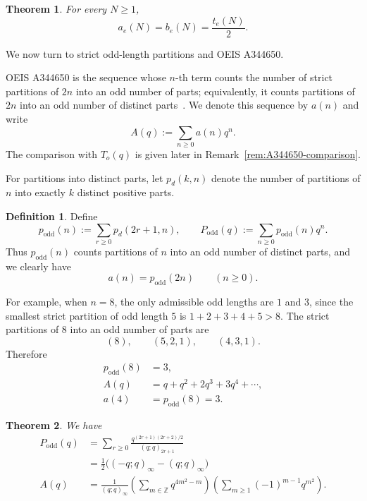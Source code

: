 \documentclass[reqno]{amsart}
\theoremstyle{plain}
\newtheorem{theorem}{Theorem}
\theoremstyle{definition}
\newtheorem{definition}{Definition}
\theoremstyle{remark}
\numberwithin{equation}{section}
\newcommand{\qpoch}[2]{(#1;#2)_\infty}
\newcommand{\qpochn}[3]{(#1;#2)_{#3}}
\begin{document}
\begin{theorem}\label{thm:Te-partitions}
For every $N\ge 1$,
\[
a_e(N)=b_e(N)=\frac{t_e(N)}{2}.
\]
\end{theorem}

We now turn to strict odd-length partitions and OEIS A344650.

OEIS A344650 is the sequence whose $n$-th term counts the number of strict partitions of $2n$ into an odd number of parts; equivalently, it counts partitions of $2n$ into an odd number of distinct parts~\cite{OEISA344650}. We denote this sequence by $a(n)$ and write
\[
A(q):=\sum_{n\ge 0} a(n)q^n.
\]
The comparison with $T_o(q)$ is given later in Remark~\ref{rem:A344650-comparison}.

For partitions into distinct parts, let $p_d(k,n)$ denote the number of partitions of $n$ into exactly $k$ distinct positive parts.

\begin{definition}\label{def:Podd}
Define
\[
p_{\mathrm{odd}}(n):=\sum_{r\ge 0} p_d(2r+1,n),
\qquad
P_{\mathrm{odd}}(q):=\sum_{n\ge 0} p_{\mathrm{odd}}(n)q^n.
\]
Thus $p_{\mathrm{odd}}(n)$ counts partitions of $n$ into an odd number of distinct parts, and we clearly have
\begin{equation}\label{a-podd}
a(n)=p_{\mathrm{odd}}(2n)\qquad(n\ge 0).
\end{equation}
\end{definition}

For example, when $n=8$, the only admissible odd lengths are $1$ and $3$, since the smallest strict partition of odd length $5$ is $1+2+3+4+5>8$. The strict partitions of $8$ into an odd number of parts are
\[
(8),\qquad (5,2,1),\qquad (4,3,1).
\]
Therefore
\begin{align*}
p_{\mathrm{odd}}(8)&=3,\\
A(q)&=q+q^2+2q^3+3q^4+\cdots,\\
a(4)&=p_{\mathrm{odd}}(8)=3.
\end{align*}

\begin{theorem}\label{thm:A344650}
We have
\begin{align}
P_{\mathrm{odd}}(q)
&=\sum_{r\ge 0}\frac{q^{(2r+1)(2r+2)/2}}{\qpochn{q}{q}{2r+1}} \label{Podd-1} \\
&=\frac12\bigl(\qpoch{-q}{q}-\qpoch{q}{q}\bigr) \label{Podd-2} \\
A(q)
&=\frac{1}{\qpoch{q}{q}}
\left(\sum_{m\in\mathbb Z} q^{4m^2-m}\right)
\left(\sum_{m\ge 1}(-1)^{m-1}q^{m^2}\right). \label{A344650-A}
\end{align}
\end{theorem}
\end{document}
